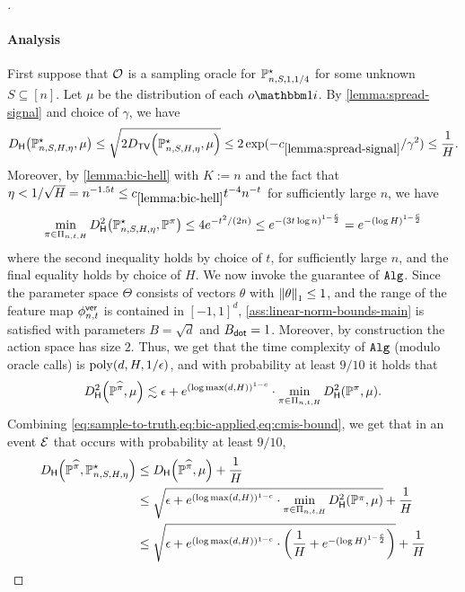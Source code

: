 \begin{proof}[]
\paragraph{Analysis} First suppose that $\mathcal{O}$ is a sampling oracle for $\mathbb{P}^\star_{n,S,1,1/4}$ for some unknown $S \subseteq [n]$. Let $\mu$ be the distribution of each $o\ind{i}$. By \cref{lemma:spread-signal} and choice of $\gamma$, we have 
\begin{equation} \Dhel{\BP^\st_{n,S,H,\eta}}{\mu} \leq \sqrt{2\Dtv{\BP^\st_{n,S,H,\eta}}{\mu}} \leq 2\exp(-c_{\ref{lemma:spread-signal}}/\gamma^2) \leq \frac{1}{H}.
\label{eq:sample-to-truth}
\end{equation}
Moreover, by \cref{lemma:bic-hell} with $K := n$ and the fact that %
$\eta < 1/\sqrt{H} = n^{-1.5t} \leq c_{\ref{lemma:bic-hell}}t^{-4}n^{-t}$ for sufficiently large $n$, we have 
\begin{equation}
\min_{\pi\in\Pi_{n,t,H}} \Dhels{\BP^\st_{n,S,H,\eta}}{\BP^\pi} \leq 4e^{-t^2/(2n)} \leq e^{-(3t\log n)^{1-\frac{c}{2}}} = e^{-(\log H)^{1-\frac{c}{2}}}
\label{eq:bic-applied}
\end{equation}
where the second inequality holds by choice of $t$, for sufficiently large $n$, and the final equality holds by choice of $H$. We now invoke the guarantee of $\texttt{Alg}$. Since the parameter space $\Theta$ consists of vectors $\theta$ with $\left \lVert \theta \right \rVert_1 \leq 1$, and the range of the feature map $\phi^{\mathsf{ver}}_{n,t}$ is contained in $[-1,1]^d$, \cref{ass:linear-norm-bounds-main} is satisfied with parameters $B = \sqrt{d}$ and $B_{\mathsf{dot}} = 1$. Moreover, by construction the action space has size $2$. Thus, we get that the time complexity of $\texttt{Alg}$ (modulo oracle calls) is $\mathrm{poly}(d,H,1/\epsilon)$, and with probability at least $9/10$ it holds that 
\begin{equation}\Dhels{\BP^{\pihat}}{\mu} \lesssim \epsilon + e^{(\log \max(d,H))^{1-c}} \cdot \min_{\pi\in\Pi_{n,t,H}} \Dhels{\BP^\pi}{\mu}.
\label{eq:cmis-bound}\end{equation}
Combining \cref{eq:sample-to-truth,eq:bic-applied,eq:cmis-bound}, we get that in an event $\mathcal{E}$ that occurs with probability at least $9/10$,
\begin{align}
\Dhel{\BP^{\pihat}}{\BP^\st_{n,S,H,\eta}}
&\leq \Dhel{\BP^{\pihat}}{\mu} + \frac{1}{H} \\
&\leq \sqrt{\epsilon + e^{(\log \max(d,H))^{1-c}} \cdot \min_{\pi\in\Pi_{n,t,H}} \Dhels{\BP^\pi}{\mu}} + \frac{1}{H} \\ 
&\leq \sqrt{\epsilon + e^{(\log \max(d,H))^{1-c}} \cdot \left(\frac{1}{H}+e^{-(\log H)^{1-\frac{c}{2}}}\right)} + \frac{1}{H} \\ 

\end{align}
\end{proof}
